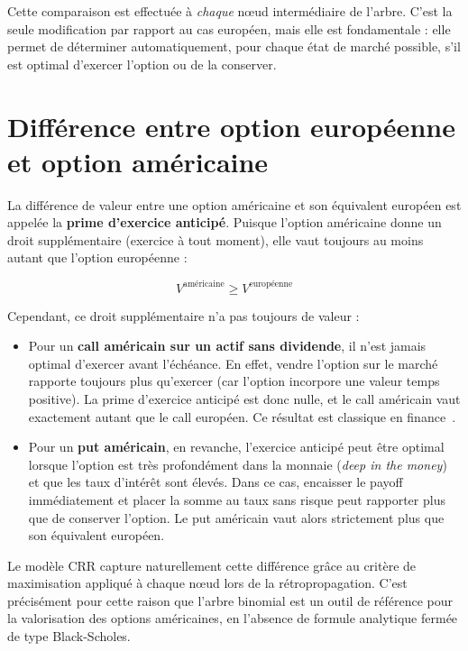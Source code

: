 \documentclass[11pt]{report}
\begin{document}
Cette comparaison est effectuée à \textit{chaque} nœud intermédiaire de
l'arbre. C'est la seule modification par rapport au cas européen, mais elle
est fondamentale : elle permet de déterminer automatiquement, pour chaque
état de marché possible, s'il est optimal d'exercer l'option ou de la
conserver.

\section{Différence entre option européenne et option américaine}

La différence de valeur entre une option américaine et son équivalent
européen est appelée la \textbf{prime d'exercice anticipé}. Puisque
l'option américaine donne un droit supplémentaire (exercice à tout moment),
elle vaut toujours au moins autant que l'option européenne :

\begin{equation}
    V^{\text{américaine}} \geq V^{\text{européenne}}
\end{equation}

Cependant, ce droit supplémentaire n'a pas toujours de valeur :

\begin{itemize}
    \item Pour un \textbf{call américain sur un actif sans dividende}, il
    n'est jamais optimal d'exercer avant l'échéance. En effet, vendre
    l'option sur le marché rapporte toujours plus qu'exercer (car l'option
    incorpore une valeur temps positive). La prime d'exercice anticipé est
    donc nulle, et le call américain vaut exactement autant que le call
    européen. Ce résultat est classique en finance~\cite{hull2018}.

    \item Pour un \textbf{put américain}, en revanche, l'exercice anticipé
    peut être optimal lorsque l'option est très profondément dans la monnaie
    (\textit{deep in the money}) et que les taux d'intérêt sont élevés. Dans
    ce cas, encaisser le payoff immédiatement et placer la somme au taux sans
    risque peut rapporter plus que de conserver l'option. Le put américain
    vaut alors strictement plus que son équivalent européen.
\end{itemize}

Le modèle CRR capture naturellement cette différence grâce au critère de
maximisation appliqué à chaque nœud lors de la rétropropagation. C'est
précisément pour cette raison que l'arbre binomial est un outil de référence
pour la valorisation des options américaines, en l'absence de formule
analytique fermée de type Black-Scholes.
\end{document}
